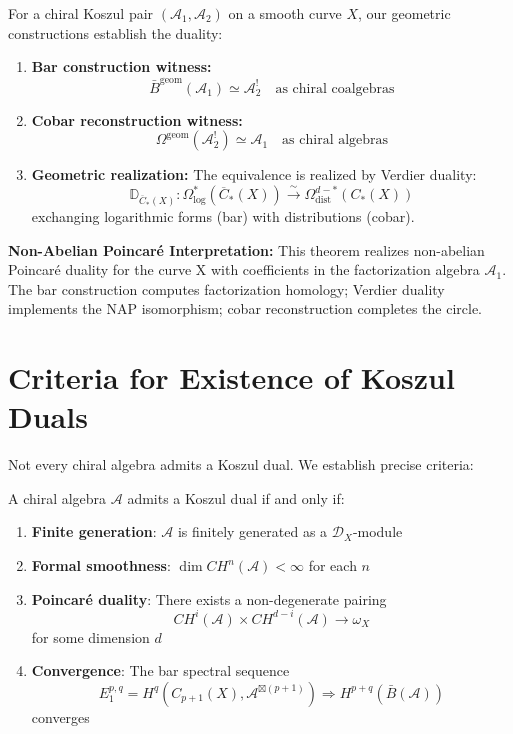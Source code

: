\begin{theorem}\label{thm:geometric-bar-cobar}
For a chiral Koszul pair $(\mathcal{A}_1, \mathcal{A}_2)$ on a smooth curve $X$, our geometric constructions establish the duality:
\begin{enumerate}
\item \textbf{Bar construction witness:}
$$\bar{B}^{\text{geom}}(\mathcal{A}_1) \simeq \mathcal{A}_2^! \quad \text{as chiral coalgebras}$$

\item \textbf{Cobar reconstruction witness:}
$$\Omega^{\text{geom}}(\mathcal{A}_2^!) \simeq \mathcal{A}_1 \quad \text{as chiral algebras}$$

\item \textbf{Geometric realization:} The equivalence is realized by Verdier duality:
$$\mathbb{D}_{\overline{C}_*(X)}: \Omega^*_{\log}(\overline{C}_*(X)) \xrightarrow{\sim} \Omega^{d-*}_{\text{dist}}(C_*(X))$$
exchanging logarithmic forms (bar) with distributions (cobar).
\end{enumerate}

\textbf{Non-Abelian Poincaré Interpretation:}
This theorem realizes non-abelian Poincaré duality for the curve X with coefficients in the factorization algebra $\mathcal{A}_1$. The bar construction computes factorization homology; Verdier duality implements the NAP isomorphism; cobar reconstruction completes the circle.
\end{theorem}

\section{Criteria for Existence of Koszul Duals}

Not every chiral algebra admits a Koszul dual. We establish precise criteria:

\begin{theorem}
A chiral algebra $\mathcal{A}$ admits a Koszul dual if and only if:
\begin{enumerate}
\item \textbf{Finite generation}: $\mathcal{A}$ is finitely generated as a $\mathcal{D}_X$-module
\item \textbf{Formal smoothness}: $\dim CH^n(\mathcal{A}) < \infty$ for each $n$
\item \textbf{Poincaré duality}: There exists a non-degenerate pairing
   $$CH^i(\mathcal{A}) \times CH^{d-i}(\mathcal{A}) \to \omega_X$$
   for some dimension $d$
\item \textbf{Convergence}: The bar spectral sequence 
   $$E_1^{p,q} = H^q(C_{p+1}(X), \mathcal{A}^{\boxtimes(p+1)}) \Rightarrow H^{p+q}(\bar{B}(\mathcal{A}))$$
   converges
\end{enumerate}
\end{theorem}

